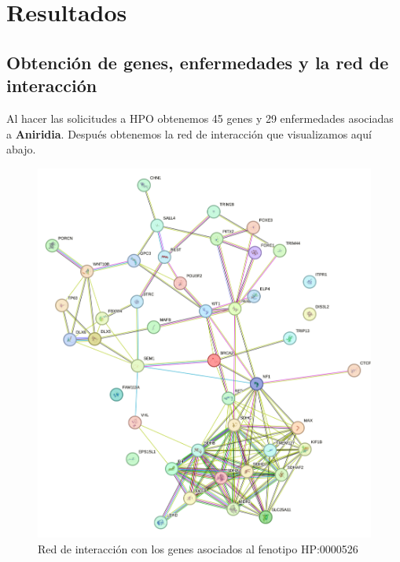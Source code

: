 \section{Resultados}

\subsection{Obtención de genes, enfermedades y la red de interacción}
Al hacer las solicitudes a HPO obtenemos 45 genes y 29 enfermedades asociadas a \textbf{Aniridia}. Después obtenemos la red de interacción que visualizamos aquí abajo.

\begin{figure}[h] %
	\centering
	\includegraphics[width=1\textwidth]{figures/red_interaccion_aniridia.png} %
	\caption{Red de interacción con los genes asociados al fenotipo HP:0000526} %
	\label{fig:m
\subsection{Red de interacciones inicial}


}
\end{figure}
